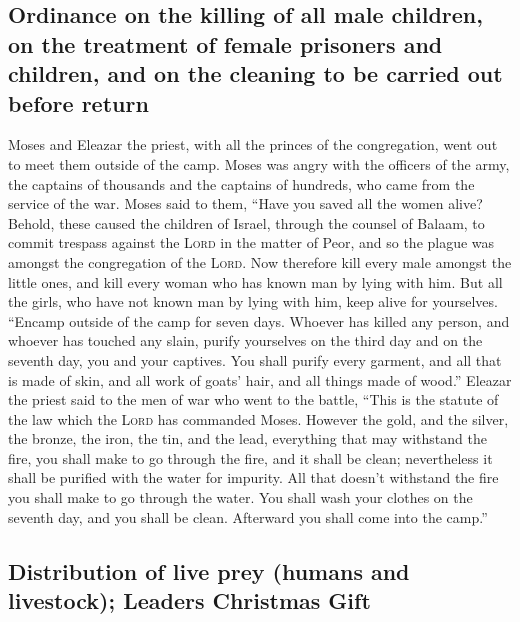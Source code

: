 \hypertarget{ordinance-on-the-killing-of-all-male-children-on-the-treatment-of-female-prisoners-and-children-and-on-the-cleaning-to-be-carried-out-before-return}{%
\subsection{Ordinance on the killing of all male children, on the
treatment of female prisoners and children, and on the cleaning to be
carried out before
return}\label{ordinance-on-the-killing-of-all-male-children-on-the-treatment-of-female-prisoners-and-children-and-on-the-cleaning-to-be-carried-out-before-return}}

 Moses and Eleazar the priest, with all the princes of
the congregation, went out to meet them outside of the camp.
 Moses was angry with the officers of the army, the
captains of thousands and the captains of hundreds, who came from the
service of the war.  Moses said to them, ``Have you saved
all the women alive?  Behold, these caused the children
of Israel, through the counsel of Balaam, to commit trespass against the
\textsc{Lord} in the matter of Peor, and so the plague was amongst the
congregation of the \textsc{Lord}.  Now therefore kill
every male amongst the little ones, and kill every woman who has known
man by lying with him.  But all the girls, who have not
known man by lying with him, keep alive for yourselves. 
``Encamp outside of the camp for seven days. Whoever has killed any
person, and whoever has touched any slain, purify yourselves on the
third day and on the seventh day, you and your captives. 
You shall purify every garment, and all that is made of skin, and all
work of goats' hair, and all things made of wood.'' 
Eleazar the priest said to the men of war who went to the battle, ``This
is the statute of the law which the \textsc{Lord} has commanded Moses.
 However the gold, and the silver, the bronze, the iron,
the tin, and the lead,  everything that may withstand the
fire, you shall make to go through the fire, and it shall be clean;
nevertheless it shall be purified with the water for impurity. All that
doesn't withstand the fire you shall make to go through the water.
 You shall wash your clothes on the seventh day, and you
shall be clean. Afterward you shall come into the camp.''

\hypertarget{distribution-of-live-prey-humans-and-livestock-leaders-christmas-gift}{%
\subsection{Distribution of live prey (humans and livestock); Leaders
Christmas
Gift}\label{distribution-of-live-prey-humans-and-livestock-leaders-christmas-gift}}


